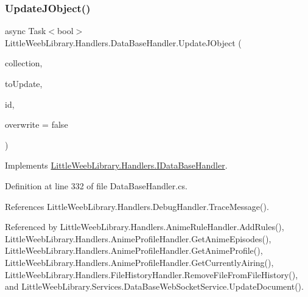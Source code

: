 \subsubsection{\texorpdfstring{Update\+J\+Object()}{UpdateJObject()}\hspace{0.1cm}{\footnotesize\ttfamily [1/2]}}
{\footnotesize\ttfamily async Task$<$bool$>$ Little\+Weeb\+Library.\+Handlers.\+Data\+Base\+Handler.\+Update\+J\+Object (\begin{DoxyParamCaption}\item[{string}]{collection,  }\item[{J\+Object}]{to\+Update,  }\item[{string}]{id,  }\item[{bool}]{overwrite = {\ttfamily false} }\end{DoxyParamCaption})}



Implements \mbox{\hyperlink{interface_little_weeb_library_1_1_handlers_1_1_i_data_base_handler_a30fbd69419ce902612a3c323b451f3fa}{Little\+Weeb\+Library.\+Handlers.\+I\+Data\+Base\+Handler}}.



Definition at line 332 of file Data\+Base\+Handler.\+cs.



References Little\+Weeb\+Library.\+Handlers.\+Debug\+Handler.\+Trace\+Message().



Referenced by Little\+Weeb\+Library.\+Handlers.\+Anime\+Rule\+Handler.\+Add\+Rules(), Little\+Weeb\+Library.\+Handlers.\+Anime\+Profile\+Handler.\+Get\+Anime\+Episodes(), Little\+Weeb\+Library.\+Handlers.\+Anime\+Profile\+Handler.\+Get\+Anime\+Profile(), Little\+Weeb\+Library.\+Handlers.\+Anime\+Profile\+Handler.\+Get\+Currently\+Airing(), Little\+Weeb\+Library.\+Handlers.\+File\+History\+Handler.\+Remove\+File\+From\+File\+History(), and Little\+Weeb\+Library.\+Services.\+Data\+Base\+Web\+Socket\+Service.\+Update\+Document().


